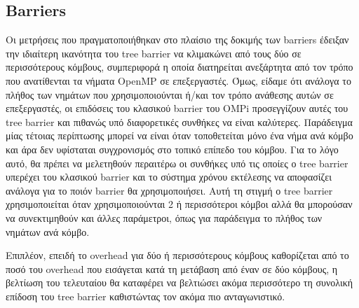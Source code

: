 \subsection{Barriers}
Οι μετρήσεις που πραγματοποιήθηκαν στο πλαίσιο της δοκιμής των barriers έδειξαν την ιδιαίτερη ικανότητα του tree barrier να κλιμακώνει από τους δύο σε περισσότερους κόμβους, συμπεριφορά η οποία διατηρείται ανεξάρτητα από τον τρόπο που ανατίθενται τα νήματα OpenMP σε επεξεργαστές. Όμως, είδαμε ότι ανάλογα το πλήθος των νημάτων που χρησιμοποιούνται ή/και τον τρόπο ανάθεσης αυτών σε επεξεργαστές, οι επιδόσεις του κλασικού barrier του OMPi προσεγγίζουν αυτές του tree barrier και πιθανώς υπό διαφορετικές συνθήκες να είναι καλύτερες. Παράδειγμα μίας τέτοιας περίπτωσης μπορεί να είναι όταν τοποθετείται μόνο ένα νήμα ανά κόμβο και άρα δεν υφίσταται συγχρονισμός στο τοπικό επίπεδο του κόμβου. Για το λόγο αυτό, θα πρέπει να μελετηθούν περαιτέρω οι συνθήκες υπό τις οποίες ο tree barrier υπερέχει του κλασικού barrier και το σύστημα χρόνου εκτέλεσης να αποφασίζει ανάλογα για το ποιόν barrier θα χρησιμοποιήσει. Αυτή τη στιγμή ο tree barrier χρησιμοποιείται όταν χρησιμοποιούνται 2 ή περισσότεροι κόμβοι αλλά θα μπορούσαν να συνεκτιμηθούν και άλλες παράμετροι, όπως για παράδειγμα το πλήθος των νημάτων ανά κόμβο.

Επιπλέον, επειδή το overhead για δύο ή περισσότερους κόμβους καθορίζεται από το ποσό του overhead που εισάγεται κατά τη μετάβαση από έναν σε δύο κόμβους, η βελτίωση του τελευταίου θα καταφέρει να βελτιώσει ακόμα περισσότερο τη συνολική επίδοση του tree barrier καθιστώντας τον ακόμα πιο ανταγωνιστικό.